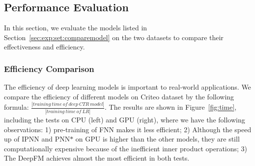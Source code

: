 \subsection{Performance Evaluation}\label{sec:exp:perfor}

In this section, we evaluate the models listed in Section~\ref{sec:exp:set:comparemodel} on the two datasets to compare their effectiveness and efficiency.

\subsubsection{Efficiency Comparison}\label{sec:exp:perfor:time}

The efficiency of deep learning models is important to real-world applications. We compare the efficiency of different models on Criteo dataset by the following formula: $\frac{|training\ time\ of\ deep\ CTR\ model|}{|training\ time\ of\ LR|}$. The results are shown in Figure~\ref{fig:time}, including the tests on CPU (left) and GPU (right), where we have the following observations:
1) pre-training of FNN makes it less efficient;
2) Although the speed up of IPNN and PNN$\ast$ on GPU is higher than the other models, they are still computationally expensive because of the inefficient inner product operations;
3) The DeepFM achieves almost the most efficient in both tests.

%

